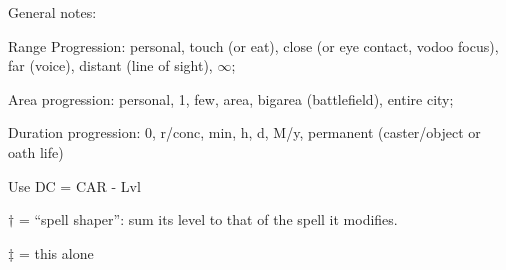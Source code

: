 \documentclass[10pt,a4paper]{article}
\begin{document}
General notes:
\begin{description}
\item Range Progression: personal, touch (or eat), close (or eye contact, vodoo focus), far (voice), distant (line of sight), $\infty$;
\item Area progression: personal, 1, few, area, bigarea (battlefield), entire city;
\item Duration progression: 0, r/conc, min, h, d, M/y, permanent (caster/object or oath life)
\item Use DC = CAR - Lvl
\end{description}


\begin{description}
\item $\dagger$ = ``spell shaper'': sum its level to that of the spell it modifies.
\item $\ddagger$ = this alone
\end{description}
\end{document}
